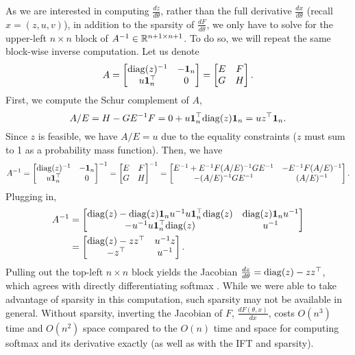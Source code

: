 \documentclass[11pt]{article}
\begin{document}
As we are interested in computing $\frac{dz}{d\theta}$,
rather than the full derivative $\frac{dx}{d\theta}$ (recall $x = (z,u,v)$),
in addition to the sparsity of $\frac{dF}{d\theta}$, 
we only have to solve for the upper-left $n\times n$ block of $A^{-1}\in\mathbb{R}^{n+1\times n+1}$.
To do so, we will repeat the same block-wise inverse computation.
Let us denote
$$A
= \begin{bmatrix} \mathrm{diag}(z)^{-1} & -\mathbf{1}_n \\ u\mathbf{1}_n^\top & 0 \end{bmatrix}
= \begin{bmatrix}E & F \\ G & H\end{bmatrix}.
$$
First, we compute the Schur complement of $A$,
\begin{equation}
A/E = H - GE^{-1}F = 0 + u\mathbf{1}_n^\top\mathrm{diag}(z)\mathbf{1}_n = uz^\top\mathbf{1}_n.
\end{equation}
Since $z$ is feasible, we have $A/E = u$ due to the equality constraints
($z$ must sum to 1 as a probability mass function).
Then, we have
\begin{equation}
A^{-1} = \begin{bmatrix}
\mathrm{diag}(z)^{-1} & -\mathbf{1}_n\\
u\mathbf{1}^\top_n & 0
\end{bmatrix}^{-1}
=\begin{bmatrix}E & F \\ G & H\end{bmatrix}^{-1}
= \begin{bmatrix}
E^{-1} + E^{-1}F(A/E)^{-1}GE^{-1} & -E^{-1}F(A/E)^{-1}\\
-(A/E)^{-1}GE^{-1} & (A/E)^{-1}
\end{bmatrix}.
\end{equation}
Plugging in,
\begin{equation}
\begin{aligned}
A^{-1} 
&= \begin{bmatrix}
\mathrm{diag}(z) - \mathrm{diag}(z)\mathbf{1}_nu^{-1}u\mathbf{1}^\top_n\mathrm{diag}(z)
    & \mathrm{diag}(z)\mathbf{1}_nu^{-1}\\
-u^{-1}u\mathbf{1}^\top_n \mathrm{diag}(z) & u^{-1}
\end{bmatrix}\\
&= \begin{bmatrix}
\mathrm{diag}(z) - zz^\top
    & u^{-1}z\\
    -z^\top & u^{-1}
\end{bmatrix}.
\end{aligned}
\end{equation}
Pulling out the top-left $n\times n$ block yields
the Jacobian $\frac{d z}{d\theta} = \mathrm{diag}(z) - zz^\top$,
which agrees with directly differentiating softmax \citep{sparsemax}.
While we were able to take advantage of sparsity in this computation,
such sparsity may not be available in general.
Without sparsity, inverting the Jacobian of $F$, $\frac{dF(\theta,x)}{dx}$,
costs $O(n^3)$ time and $O(n^2)$ space
compared to the $O(n)$ time and space for computing softmax and its
derivative exactly (as well as with the IFT and sparsity).
\end{document}
